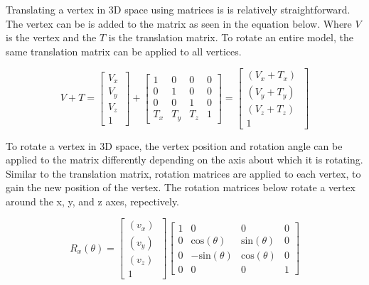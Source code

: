\noindent
Translating a vertex in 3D space using matrices is is relatively straightforward. The vertex can be is added to the matrix as seen in the equation below. Where $V$ is the vertex and the $T$ is the translation matrix. To rotate an entire model, the same translation matrix can be applied to all vertices.

\begin{equation}
V + T = \begin{bmatrix}
V_{x} \\
V_{y} \\
V_{z}~ \\
1
\end{bmatrix}
+
\begin{bmatrix}
1 & 0 & 0 & 0\\
0 & 1 & 0 & 0\\
0 & 0 & 1 & 0\\
T_{x} & T_{y} & T_{z} & 1
\end{bmatrix}
= \begin{bmatrix}
(V_x + T_x)~ \\
(V_y + T_y)~ \\
(V_z + T_z)~ \\
1
\end{bmatrix}
\end{equation}

\noindent
To rotate a vertex in 3D space, the vertex position and rotation angle can be applied to the matrix differently depending on the axis about which it is rotating. Similar to the translation matrix, rotation matrices are applied to each vertex, to gain the new position of the vertex. The rotation matrices below rotate a vertex around the x, y, and z axes, repectively. 

\begin{equation}
R_x(\theta) = 
\begin{bmatrix}
(v_x)~ \\
(v_y)~ \\ 
(v_z)~ \\
1
\end{bmatrix}
\begin{bmatrix}
1 	& 0 					& 0 					& 0\\
0 	& \text{cos}(\theta) 	& \text{sin}(\theta) 	& 0\\
0 	& -\text{sin}(\theta) 	& \text{cos}(\theta) 	& 0\\
0 	& 0 					& 0 					& 1
\end{bmatrix}
\end{equation}

